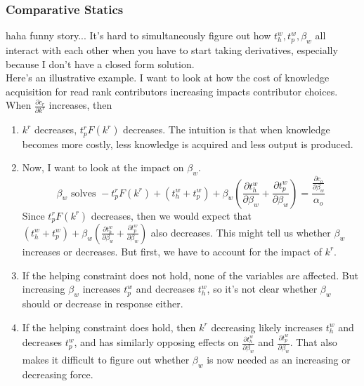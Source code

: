 \documentclass[12pt,notitlepage]{article}
\begin{document}
\subsubsection{Comparative Statics}
haha funny story... It's hard to simultaneously figure out how $t_h^w, t_p^w, \beta_w$ all interact with each other when you have to start taking derivatives, especially because I don't have a closed form solution. \\
Here's an illustrative example. I want to look at how the cost of knowledge acquisition for read rank contributors increasing impacts contributor choices. \\
When $\frac{\partial c_r}{\partial k^r}$ increases, then 
\begin{enumerate}
    \item $k^r$ decreases, $t_p^r F(k^r)$ decreases. The intuition is that when knowledge becomes more costly, less knowledge is acquired and less output is produced. 
    \item Now, I want to look at the impact on $\beta_w$. 
    $$\beta_w \text{ solves } -t_p^rF(k^r) + (t_h^w + t_p^w) + \beta_w\left(\frac{\partial t_h^w}{\partial \beta_w} + \frac{\partial t_p^w}{\partial \beta_w}\right) = \frac{\frac{\partial c_o}{\partial \beta_w}}{\alpha_o}$$
    Since $t_p^rF(k^r)$ decreases, then we would expect that $(t_h^w + t_p^w) + \beta_w\left(\frac{\partial t_h^w}{\partial \beta_w} + \frac{\partial t_p^w}{\partial \beta_w}\right)$ also decreases. This might tell us whether $\beta_w$ increases or decreases. But first, we have to account for the impact of $k^r$. 
    \item If the helping constraint does not hold, none of the variables are affected. But increasing $\beta_w$ increases $t_p^w$ and decreases $t_h^w$, so it's not clear whether $\beta_w$ should or decrease in response either. 
    \item If the helping constraint does hold, then $k^r$ decreasing likely increases $t_h^w$ and decreases $t_p^w$, and has similarly opposing effects on $\frac{\partial t_h^w}{\partial \beta_w}$ and $\frac{\partial t_p^w}{\partial \beta_w}$. That also makes it difficult to figure out whether $\beta_w$ is now needed as an increasing or decreasing force. 
\end{enumerate}
\end{document}
